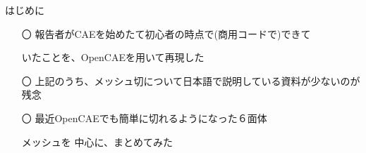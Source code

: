 \begin{frame}{はじめに}
  \begin{itemize}[itemsep=2.5ex, leftmargin=3mm]
      \large
      \item[〇] 報告者がCAEを始めたて初心者の時点で(商用コードで)できて

                いたことを、OpenCAEを用いて再現した

      \item[〇] 上記のうち、メッシュ切について日本語で説明している資料が少ないのが残念

      \item[〇] 最近OpenCAEでも簡単に切れるようになった６面体

                メッシュを 中心に、まとめてみた
  \end{itemize}
\end{frame}
